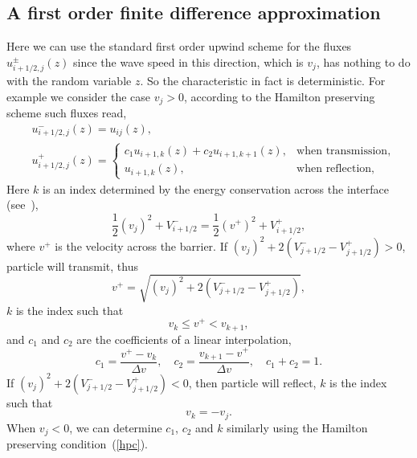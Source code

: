 \documentclass[12pt]{article}
\theoremstyle{plain}
\theoremstyle{remark}
\theoremstyle{remark}
\theoremstyle{remark}
\numberwithin{equation}{section}
\newcommand{\Dv}{\Delta v}
\begin{document}
\subsection{A first order finite difference approximation}
Here we can use the standard first order upwind scheme for the fluxes $u^{\pm}_{i+1/2, j}(z)$ since the wave speed in this direction, which is $v_j$, has nothing to do with the random variable $z$. So the characteristic in fact is deterministic. For example we consider the case $v_j>0$, according to the Hamilton preserving scheme such fluxes read,
\begin{equation}\label{cck}
  \begin{aligned}
    &u^-_{i+1/2,j}(z) = u_{ij}(z), \\
    &u^+_{i+1/2,j}(z) = 
    \begin{cases}
      c_1 u_{i+1,k}(z) + c_2 u_{i+1,k+1}(z), &\text{when transmission}, \\
      u_{i+1, k}(z), &\text{when reflection},
    \end{cases}
  \end{aligned}
\end{equation}
Here $k$ is an index determined by the energy conservation across the interface (see~\cite{Wen:2005ueba}),
\begin{equation}\label{hpc}
  \frac{1}{2}(v_j)^2 + V^-_{i+1/2} = \frac{1}{2}(v^+)^2 + V^+_{i+1/2},
\end{equation}
where $v^+$ is the velocity across the barrier. If $(v_j)^2 + 2(V^-_{j+1/2} - V^+_{j+1/2})>0$, particle will transmit, thus
\begin{equation}
  v^+ = \sqrt{(v_j)^2 + 2(V^-_{j+1/2} - V^+_{j+1/2})},
\end{equation}
$k$ is the index such that
\begin{equation}
  v_k\leq v^+ < v_{k+1},
\end{equation}
and $c_1$ and $c_2$ are the coefficients of a linear interpolation,
\begin{equation}
  c_1 = \frac{v^+ - v_k}{\Dv}, \quad c_2 = \frac{v_{k+1} - v^+}{\Dv}, \quad c_1 + c_2 = 1.
\end{equation}
If $(v_j)^2 + 2(V^-_{j+1/2} - V^+_{j+1/2})<0$, then particle will reflect,
$k$  is the index such that
\begin{equation}\label{-j}
  v_k = -v_j.
\end{equation}
When $v_j<0$, we can determine $c_1$, $c_2$ and $k$ similarly using the Hamilton preserving condition~(\ref{hpc}).
\end{document}

